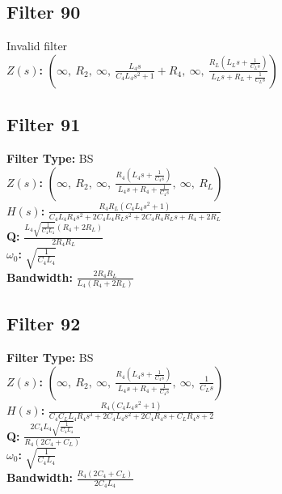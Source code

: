 \documentclass{article}
\begin{document}
\subsection*{Filter 90}
Invalid filter \\ 
\textbf{$Z(s)$:} $\left( \infty, \  R_{2}, \  \infty, \  \frac{L_{4} s}{C_{4} L_{4} s^{2} + 1} + R_{4}, \  \infty, \  \frac{R_{L} \left(L_{L} s + \frac{1}{C_{L} s}\right)}{L_{L} s + R_{L} + \frac{1}{C_{L} s}}\right)$ \\ 
\subsection*{Filter 91}
\textbf{Filter Type:} BS \\ 
\textbf{$Z(s)$:} $\left( \infty, \  R_{2}, \  \infty, \  \frac{R_{4} \left(L_{4} s + \frac{1}{C_{4} s}\right)}{L_{4} s + R_{4} + \frac{1}{C_{4} s}}, \  \infty, \  R_{L}\right)$ \\ 
\textbf{$H(s)$:} $\frac{R_{4} R_{L} \left(C_{4} L_{4} s^{2} + 1\right)}{C_{4} L_{4} R_{4} s^{2} + 2 C_{4} L_{4} R_{L} s^{2} + 2 C_{4} R_{4} R_{L} s + R_{4} + 2 R_{L}}$ \\ 
\textbf{Q:} $\frac{L_{4} \sqrt{\frac{1}{C_{4} L_{4}}} \left(R_{4} + 2 R_{L}\right)}{2 R_{4} R_{L}}$ \\ 
\textbf{$\omega_0$:} $\sqrt{\frac{1}{C_{4} L_{4}}}$ \\ 
\textbf{Bandwidth:} $\frac{2 R_{4} R_{L}}{L_{4} \left(R_{4} + 2 R_{L}\right)}$ \\ 
\subsection*{Filter 92}
\textbf{Filter Type:} BS \\ 
\textbf{$Z(s)$:} $\left( \infty, \  R_{2}, \  \infty, \  \frac{R_{4} \left(L_{4} s + \frac{1}{C_{4} s}\right)}{L_{4} s + R_{4} + \frac{1}{C_{4} s}}, \  \infty, \  \frac{1}{C_{L} s}\right)$ \\ 
\textbf{$H(s)$:} $\frac{R_{4} \left(C_{4} L_{4} s^{2} + 1\right)}{C_{4} C_{L} L_{4} R_{4} s^{3} + 2 C_{4} L_{4} s^{2} + 2 C_{4} R_{4} s + C_{L} R_{4} s + 2}$ \\ 
\textbf{Q:} $\frac{2 C_{4} L_{4} \sqrt{\frac{1}{C_{4} L_{4}}}}{R_{4} \left(2 C_{4} + C_{L}\right)}$ \\ 
\textbf{$\omega_0$:} $\sqrt{\frac{1}{C_{4} L_{4}}}$ \\ 
\textbf{Bandwidth:} $\frac{R_{4} \left(2 C_{4} + C_{L}\right)}{2 C_{4} L_{4}}$ \\ 
\end{document}
